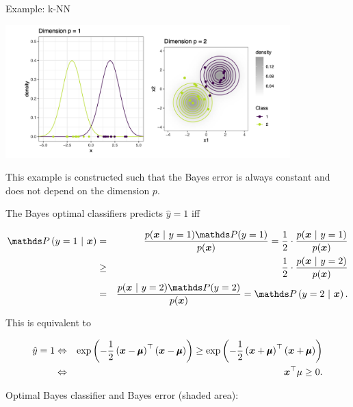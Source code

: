\begin{vbframe}{Example: k-NN}
\framebreak 

\begin{center}
\includegraphics[width = 11cm]{figure_man/knn_density.png}
\end{center}

\framebreak 
This example is constructed such that the Bayes error is always constant and does not depend on the dimension $p$. 

\lz 

The Bayes optimal classifiers predicts $\hat y = 1$ iff

\begin{footnotesize}
  \begin{eqnarray*}
  \P\left(y = 1 ~|~ \xv\right) &=& \frac{p(\xv ~|~y = 1)\P(y = 1)}{p(\xv)} = \frac{1}{2} \cdot \frac{p(\xv ~|~y = 1)}{p(\xv)}\\
  &\ge& \frac{1}{2} \cdot \frac{p(\xv ~|~y = 2)}{p(\xv)} \\ &=& \frac{p(\xv ~|~y = 2)\P(y = 2)}{p(\xv)} = \P\left(y = 2 ~|~ \xv\right). 
  \end{eqnarray*}
\end{footnotesize}

This is equivalent to 

\vspace*{-0.5cm}

\begin{footnotesize}
  \begin{eqnarray*}
  \hat y = 1 &\Leftrightarrow& \exp\left(-\frac{1}{2} \left(\bm{x} - \pmb\mu\right)^\top \left(\bm{x} - \pmb\mu\right)\right) \ge \exp\left(-\frac{1}{2} \left(\bm{x} + \pmb\mu\right)^\top \left(\bm{x} + \pmb\mu\right)\right) \\
  &\Leftrightarrow& \bm{x}^\top \mu \ge 0. 
  \end{eqnarray*}
\end{footnotesize}

\framebreak

Optimal Bayes classifier and Bayes error (shaded area):


\end{vbframe}
